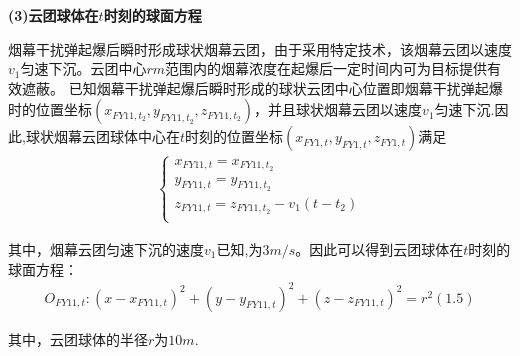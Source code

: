 \documentclass[../main.tex]{subfiles}
\begin{document}
\noindent \textbf{(3)云团球体在$t$时刻的球面方程 }
\par 烟幕干扰弹起爆后瞬时形成球状烟幕云团，由于采用特定技术，该烟幕云团以速度$v_1$匀速下沉。云团中心$rm$范围内的烟幕浓度在起爆后一定时间内可为目标提供有效遮蔽。
已知烟幕干扰弹起爆后瞬时形成的球状云团中心位置即烟幕干扰弹起爆时的位置坐标$\left( x_{FY11,t_2},y_{FY11,t_2},z_{FY11,t_2} \right)$，并且球状烟幕云团以速度$v_1$匀速下沉.因此,球状烟幕云团球体中心在$t$时刻的位置坐标$(x_{FY1,t}, y_{FY1,{t}}, z_{FY1,{t}})$满足
\begin{align}\label{1.10}
\left\{ \begin{array}{l}
	x_{FY11,t}=x_{FY11,t_2}\\
	y_{FY11,t}=y_{FY11,t_2}\\
	z_{FY11,t}=z_{FY11,t_2}-v_1\left( t-t_2 \right)\\
\end{array} \right. 
\end{align}
\par 其中，烟幕云团匀速下沉的速度$v_1$已知,为$3m/s$。因此可以得到云团球体在$t$时刻的球面方程：
\begin{align}\label{1.11}
O_{FY11,t}:\left( x-x_{FY11,t} \right) ^2+\left( y-y_{FY11,t} \right) ^2+\left( z-z_{FY11,t} \right) ^2=r^2\left( 1.5 \right) 
\end{align}
\par 其中，云团球体的半径$r$为$10m$.
\end{document}
